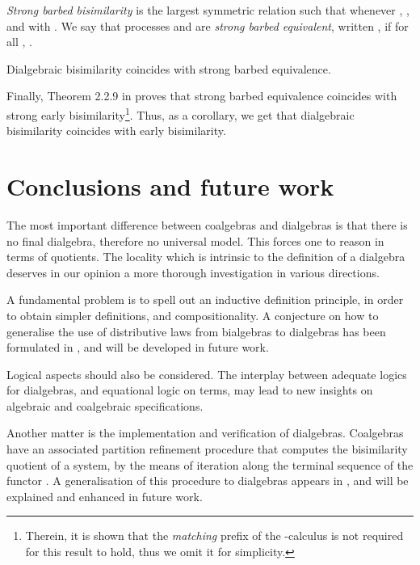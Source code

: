 \documentclass[orivec]{llncs}
\newcommand{\defend}{}
\renewenvironment{definition}{\begin{defn}}{\defend\end{defn}}
\renewenvironment{theorem}{\begin{thm}}{\defend\end{thm}}
\begin{document}
\begin{definition}\label{def:pi-strong-barbed}
\emph{Strong barbed bisimilarity} is the largest symmetric relation  such that whenever , , and  with . 
We say that processes  and  are \emph{strong barbed equivalent}, written , if for all , .
\end{definition}


\begin{theorem}\label{thm:pi-calculus-characterization}
 Dialgebraic bisimilarity coincides with strong barbed equivalence.
\end{theorem}

Finally, Theorem 2.2.9 in \cite{San01} proves that strong barbed equivalence coincides with strong early bisimilarity\footnote{Therein, it is shown that the \emph{matching} prefix of the -calculus is not required for this result to hold, thus we omit it for simplicity.}. Thus, as a corollary, we get that dialgebraic bisimilarity coincides with early bisimilarity.


\noindent 









\section{Conclusions and future work}

The most important difference between coalgebras and dialgebras is that there is no final dialgebra, therefore no universal model. This forces one to reason in terms of quotients. The locality which is intrinsic to the definition of a dialgebra deserves in our opinion a more thorough investigation in various directions.

A fundamental problem is to spell out an inductive definition principle, in order to obtain simpler definitions, and compositionality. A conjecture on how to generalise the use of distributive laws \cite{tp97} from bialgebras to dialgebras has been formulated in \cite{Blo12}, and will be developed in future work.  

Logical aspects should also be considered. The interplay between adequate logics for dialgebras, and equational logic on terms, may lead to new insights on algebraic and coalgebraic specifications. 

Another matter is the implementation and verification of dialgebras. Coalgebras have an associated partition refinement procedure that computes the bisimilarity quotient of a system, by the means of iteration along the terminal sequence of the functor . A generalisation of this procedure to dialgebras appears in \cite{Blo12}, and will be explained and enhanced in future work.
\end{document}
